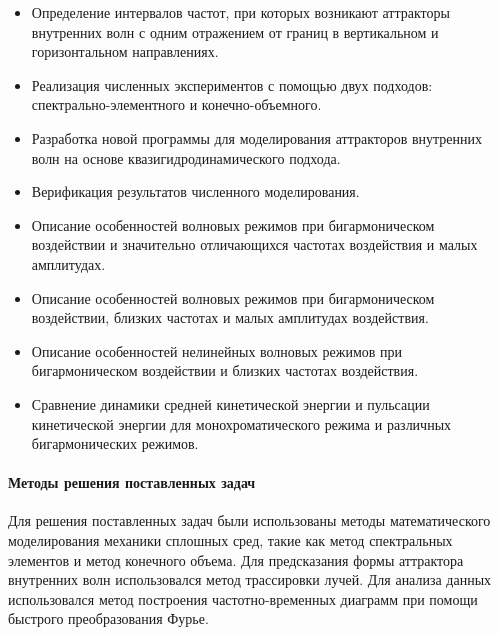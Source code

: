 \documentclass[utf8x]{G7-32} %
\begin{document}
\begin{itemize}

  \item 
    Определение интервалов частот, при которых возникают аттракторы внутренних волн с одним отражением от границ в вертикальном и горизонтальном направлениях.
  

    
  \item Реализация численных экспериментов с помощью двух подходов: спектрально-элементного и конечно-объемного.

  \item Разработка новой программы для моделирования аттракторов внутренних волн на основе квазигидродинамического подхода.
    
  \item Верификация результатов численного моделирования.

  \item Описание особенностей волновых режимов при бигармоническом воздействии и значительно отличающихся частотах воздействия и малых амплитудах.

  \item Описание особенностей волновых режимов при бигармоническом воздействии, близких частотах и малых амплитудах воздействия.
    
  \item Описание особенностей нелинейных волновых режимов при бигармоническом воздействии и близких частотах воздействия.

  \item Сравнение динамики средней кинетической энергии и пульсации кинетической энергии для монохроматического режима и различных бигармонических режимов.
    
\end{itemize}

\newpage

\paragraph{Методы решения поставленных задач}

Для решения поставленных задач были использованы методы математического моделирования механики сплошных сред, такие как метод спектральных элементов и метод конечного объема. Для предсказания формы аттрактора внутренних волн использовался метод трассировки лучей. Для анализа данных использовался метод построения частотно-временных диаграмм при помощи быстрого преобразования Фурье.
\end{document}
